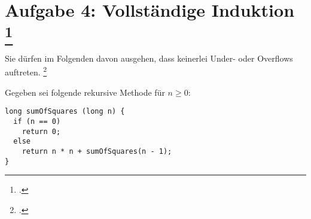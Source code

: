\documentclass{lehramt-informatik-aufgabe}
\begin{document}

\section{Aufgabe 4: Vollständige Induktion
\footcite{sosy:ab:8}
}

Sie dürfen im Folgenden davon ausgehen, dass keinerlei Under- oder
Overflows auftreten.
\footcite[Thema 1 Aufgabe 4]{examen:66115:2017:03}

\noindent
Gegeben sei folgende rekursive Methode für $n \geq 0$:

\begin{verbatim}
long sumOfSquares (long n) {
  if (n == 0)
    return 0;
  else
    return n * n + sumOfSquares(n - 1);
}
\end{verbatim}
\end{document}
